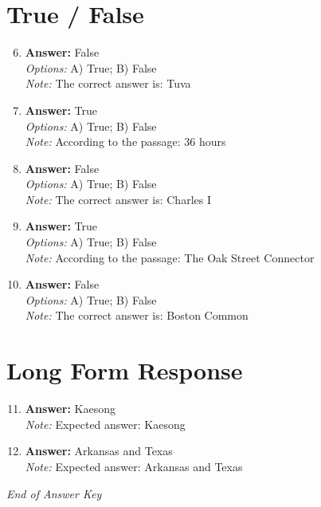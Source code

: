 \documentclass[12pt]{article}
\begin{document}
\section*{True / False}
\begin{enumerate}[label=\arabic*.]
\setcounter{enumi}{5}
\item \textbf{Answer:} False
\\ \textit{Options:} A) True; B) False
\\ \textit{Note:} The correct answer is: Tuva
\item \textbf{Answer:} True
\\ \textit{Options:} A) True; B) False
\\ \textit{Note:} According to the passage: 36 hours
\item \textbf{Answer:} False
\\ \textit{Options:} A) True; B) False
\\ \textit{Note:} The correct answer is: Charles I
\item \textbf{Answer:} True
\\ \textit{Options:} A) True; B) False
\\ \textit{Note:} According to the passage: The Oak Street Connector
\item \textbf{Answer:} False
\\ \textit{Options:} A) True; B) False
\\ \textit{Note:} The correct answer is: Boston Common
\end{enumerate}

\section*{Long Form Response}
\begin{enumerate}[label=\arabic*.]
\setcounter{enumi}{10}
\item \textbf{Answer:} Kaesong
\\ \textit{Note:} Expected answer: Kaesong
\item \textbf{Answer:} Arkansas and Texas
\\ \textit{Note:} Expected answer: Arkansas and Texas
\end{enumerate}

\vfill
\noindent\textit{End of Answer Key}
\end{document}
